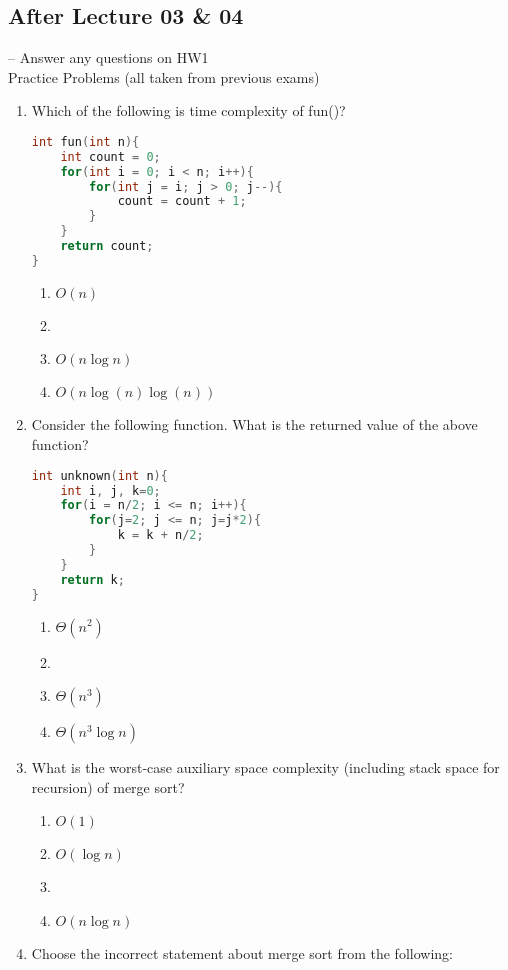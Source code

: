 \documentclass[12pt]{report}
\newcommand{\choicelabel}{\alph*)}
\begin{document}
\subsection{After Lecture 03 \& 04} -- Answer any questions on HW1\\
Practice Problems (all taken from previous exams)
\begin{enumerate}[label=\arabic*.]
    \item Which of the following is time complexity of fun()?
	\begin{lstlisting}[language=C,label={lst:fun}]
int fun(int n){
	int count = 0;
	for(int i = 0; i < n; i++){
		for(int j = i; j > 0; j--){
			count = count + 1;
		}
	}
	return count;
}
	\end{lstlisting}
	\begin{enumerate}[label=\choicelabel]
	    \item $O(n)$
	    \item {}
	    \item $O(n\log n)$
	    \item $O(n\log(n)\log(n))$
	\end{enumerate}
	\item Consider the following function. What is the returned value of the above function?
	\begin{lstlisting}[language=C,label={lst:unknown}]
int unknown(int n){
	int i, j, k=0;
	for(i = n/2; i <= n; i++){
		for(j=2; j <= n; j=j*2){
			k = k + n/2;
		}
	}
	return k;
}
	\end{lstlisting}
	\begin{enumerate}[label=\choicelabel]
	    \item $\Theta(n^{2})$
	    \item {}
	    \item $\Theta(n^{3})$
	    \item $\Theta(n^{3}\log n)$
	\end{enumerate}
	\item What is the worst-case auxiliary space complexity (including stack space for recursion) of merge sort?
	\begin{enumerate}[label=\choicelabel]
	    \item $O(1)$
	    \item $O(\log n)$
	    \item {}
	    \item $O(n\log n)$
	\end{enumerate}
	\item Choose the incorrect statement about merge sort from the following:

\end{enumerate}
\end{document}
